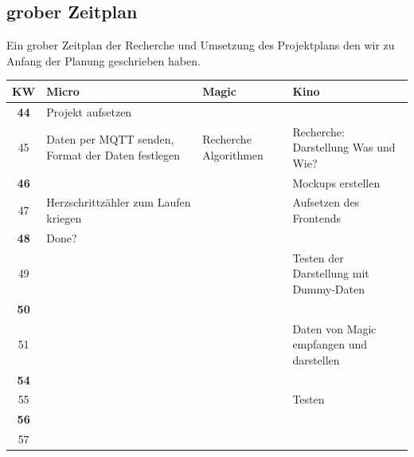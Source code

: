 \documentclass[a4paper, 11pt]{article}
\begin{document}
\subsection{grober Zeitplan}
Ein grober Zeitplan der Recherche und Umsetzung des Projektplans den wir zu Anfang der Planung geschrieben haben.
\begin{center}
    \begin{tabularx}{\textwidth}{ |c|X|X|X| }
        \hline
        \textbf{KW} & \textbf{Micro}                                    & \textbf{Magic}        & \textbf{Kino}                            \\
        \hline
        \textbf{44} & Projekt aufsetzen                                 &                       &                                          \\
        \hline
        45          & Daten per MQTT senden, Format der Daten festlegen & Recherche Algorithmen & Recherche: Darstellung Was und Wie?      \\
        \hline
        \textbf{46} &                                                   &                       & Mockups erstellen                        \\
        \hline
        47          & Herzschrittzähler zum Laufen kriegen              &                       & Aufsetzen des Frontends                  \\
        \hline
        \textbf{48} & Done?                                             &                       &                                          \\
        \hline
        49          &                                                   &                       & Testen der Darstellung mit Dummy-Daten   \\
        \hline
        \textbf{50} &                                                   &                       &                                          \\
        \hline
        51          &                                                   &                       & Daten von Magic empfangen und darstellen \\
        \hline
        \textbf{54} &                                                   &                       &                                          \\
        \hline
        55          &                                                   &                       & Testen                                   \\
        \hline
        \textbf{56} &                                                   &                       &                                          \\
        \hline
        57          &                                                   &                       &                                          \\
        \hline
    \end{tabularx}
\end{center}
\clearpage
\end{document}
